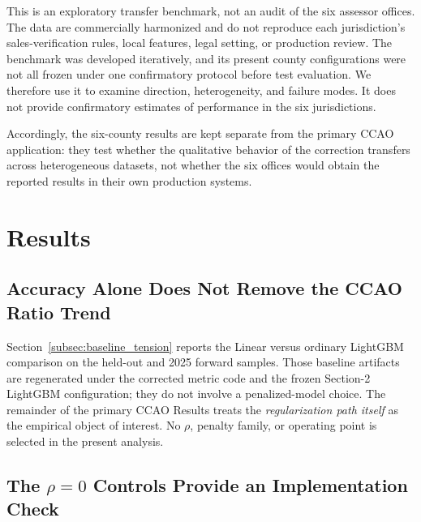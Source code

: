 \documentclass[10pt]{article}
\theoremstyle{definition}
\newcommand{\1}{\mathbf{1}}
\begin{document}
\textcolor{impGreen}{}

This is an exploratory transfer benchmark, not an audit of the six assessor offices. The data are commercially harmonized and do not reproduce each jurisdiction's sales-verification rules, local features, legal setting, or production review. The benchmark was developed iteratively, and its present county configurations were not all frozen under one confirmatory protocol before test evaluation. We therefore use it to examine direction, heterogeneity, and failure modes. It does not provide confirmatory estimates of performance in the six jurisdictions.

\textcolor{impGreen}{Accordingly, the six-county results are kept separate from the primary CCAO application: they test whether the qualitative behavior of the correction transfers across heterogeneous datasets, not whether the six offices would obtain the reported results in their own production systems.}

\section{Results}
\label{sec:results}

\subsection{Accuracy Alone Does Not Remove the CCAO Ratio Trend}
\label{subsec:ccao_baseline_results}

Section~\ref{subsec:baseline_tension} reports the Linear versus ordinary LightGBM
comparison on the held-out and 2025 forward samples. Those baseline artifacts are
regenerated under the corrected metric code and the frozen Section-2 LightGBM
configuration; they do not involve a penalized-model choice. The remainder of the
primary CCAO Results treats the \emph{regularization path itself} as the empirical
object of interest. No $\rho$, penalty family, or operating point is selected in the
present analysis.

\subsection{The $\rho=0$ Controls Provide an Implementation Check}
\label{subsec:zero_control_results}
\end{document}
